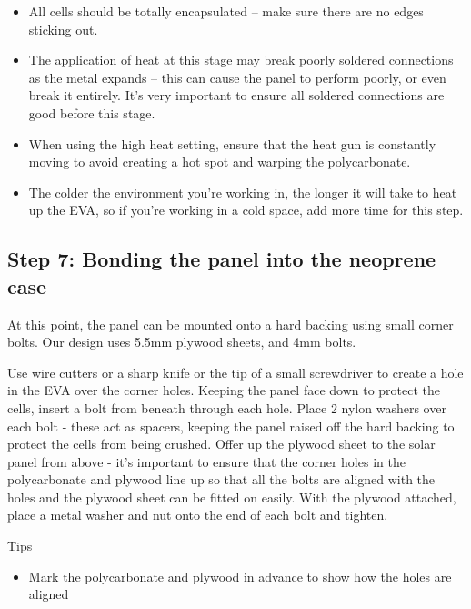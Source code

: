 \documentclass{article}
\theoremstyle{definition}
\theoremstyle{definition}
\theoremstyle{remark}
\begin{document}
    \begin{itemize}
      \item All cells should be totally encapsulated – make sure there are no edges sticking out.
      \item The application of heat at this stage may break poorly soldered connections as the metal expands – this can cause the panel to perform poorly, or even break it entirely. It's very important to ensure all soldered connections are good before this stage. 
      \item When using the high heat setting, ensure that the heat gun is constantly moving to avoid creating a hot spot and warping the polycarbonate.
      \item The colder the environment you’re working in, the longer it will take to heat up the EVA, so if you’re working in a cold space, add more time for this step.
    \end{itemize}
  

  \subsection{Step 7: Bonding the panel into the neoprene case} %
  \label{sub:step_7_bonding_the_panel_into_the_neoprene_case}

    At this point, the panel can be mounted onto a hard backing using small corner bolts. Our design uses 5.5mm plywood sheets, and 4mm bolts. 

    Use wire cutters or a sharp knife or the tip of a small screwdriver to create a hole in the EVA over the corner holes. Keeping the panel face down to protect the cells, insert a bolt from beneath through each hole. Place 2 nylon washers over each bolt - these act as spacers, keeping the panel raised off the hard backing to protect the cells from being crushed. Offer up the plywood sheet to the solar panel from above - it’s important to ensure that the corner holes in the polycarbonate and plywood line up so that all the bolts are aligned with the holes and the plywood sheet can be fitted on easily. With the plywood attached, place a metal washer and nut onto the end of each bolt and tighten.

    Tips

    \begin{itemize}
      \item Mark the polycarbonate and plywood in advance to show how the holes are aligned
    \end{itemize}
  
\end{document}
